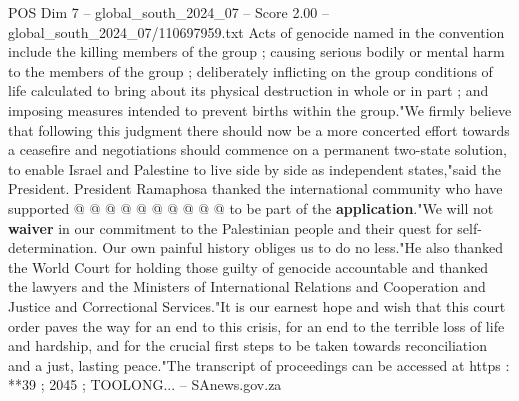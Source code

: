 \begin{textsample}{POS Dim 7 – global\_south\_2024\_07 – Score 2.00 – global\_south\_2024\_07/110697959.txt}
Acts of genocide named in the convention include the killing members of the group ; causing serious bodily or mental harm to the members of the group ; deliberately inflicting on the group conditions of life calculated to bring about its physical destruction in whole or in part ; and imposing measures intended to prevent births within the group."We firmly believe that following this judgment there should now be a more concerted effort towards a ceasefire and negotiations should commence on a permanent two-state solution, to enable Israel and Palestine to live side by side as independent states,"said the President.
President Ramaphosa thanked the international community who have supported @ @ @ @ @ @ @ @ @ @ to be part of the \textbf{application}."We will not \textbf{waiver} in our commitment to the Palestinian people and their quest for self-determination.
Our own painful history obliges us to do no less."He also thanked the World Court for holding those guilty of genocide accountable and thanked the lawyers and the Ministers of International Relations and Cooperation and Justice and Correctional Services."It is our earnest hope and wish that this court order paves the way for an end to this crisis, for an end to the terrible loss of life and hardship, and for the crucial first steps to be taken towards reconciliation and a just, lasting peace."The transcript of proceedings can be accessed at https : **39 ; 2045 ; TOOLONG... -- SAnews.gov.za

\end{textsample}
